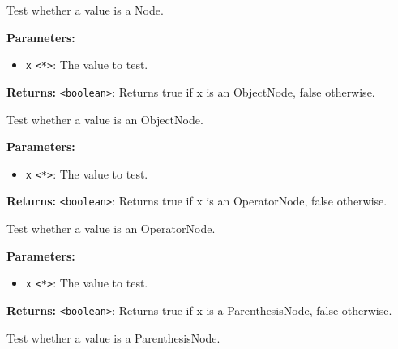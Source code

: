 \documentclass[12pt,a4paper]{article}
\begin{document}
\noindent Test whether a value is a Node.

\vspace{5mm}
\noindent {}


\noindent \textbf{Parameters:}
\begin{itemize}
  \item \texttt{x} \texttt{<*>}: The value to test.
\end{itemize}

\noindent \textbf{Returns:} \texttt{<boolean>}: Returns true if \textasciigrave{}x\textasciigrave{} is an ObjectNode, false otherwise.

\noindent Test whether a value is an ObjectNode.

\vspace{5mm}
\noindent {}


\noindent \textbf{Parameters:}
\begin{itemize}
  \item \texttt{x} \texttt{<*>}: The value to test.
\end{itemize}

\noindent \textbf{Returns:} \texttt{<boolean>}: Returns true if \textasciigrave{}x\textasciigrave{} is an OperatorNode, false otherwise.

\noindent Test whether a value is an OperatorNode.

\vspace{5mm}
\noindent {}


\noindent \textbf{Parameters:}
\begin{itemize}
  \item \texttt{x} \texttt{<*>}: The value to test.
\end{itemize}

\noindent \textbf{Returns:} \texttt{<boolean>}: Returns true if \textasciigrave{}x\textasciigrave{} is a ParenthesisNode, false otherwise.

\noindent Test whether a value is a ParenthesisNode.

\vspace{5mm}
\noindent {}
\end{document}

